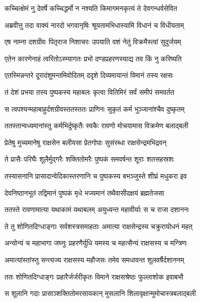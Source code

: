 \twolineshloka
{कच्चित्क्षेमं नु देवर्षे कच्चिद्धर्मो न नश्यति}
{किमागमनकृत्यं ते देवगन्धर्वसेवित} %

\twolineshloka
{अब्रवीत्तु तदा वाक्यं नारदो भगवानृषिः}
{श्रूयतामभिधास्यामि विधानं च विधीयताम्} %

\twolineshloka
{एष नाम्ना दशग्रीवः पितृराज निशाचरः}
{उपयाति वशं नेतुं विक्रमैस्त्वां सुदुर्जयम्} %

\twolineshloka
{एतेन कारणेनाहं त्वरितोऽस्म्यागतः प्रभो}
{दण्डप्रहरणस्याद्य तव किं नु करिष्यति} %

\twolineshloka
{एतस्मिन्नन्तरे दूरादंशुमन्तमिवोदितम्}
{ददृशे दिव्यमायान्तं विमानं तस्य रक्षसः} %

\twolineshloka
{तं देशं प्रभया तस्य पुष्पकस्य महाबलः}
{कृत्वा वितिमिरं सर्वं समीपं समवर्तत} %

\twolineshloka
{स त्वपश्यन्महाबाहुर्दशग्रीवस्ततस्ततः}
{प्राणिनः सुकृतं कर्म भुञ्जानांश्चैव दुष्कृतम्} %

\twolineshloka
{ततस्तान्वध्यमानांस्तु कर्मभिर्दुष्कृतैः स्वकैः}
{रावणो मोचयामास विक्रमेण बलाद्बली} %

\twolineshloka
{प्रेतेषु मुच्यमानेषु राक्षसेन बलीयसा}
{प्रेतगोपाः सुसंरब्धा राक्षसेन्द्रमभिद्रवन्} %

\twolineshloka
{ते प्रासैः परिघैः शूलैर्मुद्गरैः शक्तितोमरैः}
{पुष्पकं समवर्षन्त शूराः शतसहस्रशः} %

\twolineshloka
{तस्यासनानि प्रासादान्वेदिकास्तरणानि च}
{पुष्पकस्य बभञ्जुस्ते शीघ्रं मधुकरा इव} %

\twolineshloka
{देवनिष्ठानभूतं तद्विमानं पुष्पकं मृधे}
{भज्यमानं तथैवासीदक्षयं ब्रह्मतेजसा} %

\twolineshloka
{ततस्ते रावणामात्या यथाकामं यथाबलम्}
{अयुध्यन्त महावीर्याः स च राजा दशाननः} %

\twolineshloka
{ते तु शोणितदिग्धाङ्गाः सर्वशस्त्रसमाहताः}
{अमात्या राक्षसेन्द्रस्य चक्रुरायोधनं महत्} %

\twolineshloka
{अन्योन्यं च महाभागा जघ्नुः प्रहरणैर्युधि}
{यमस्य च महत्सैन्यं राक्षसस्य च मन्त्रिणः} %

\twolineshloka
{अमात्यांस्तांस्तु सन्त्यज्य राक्षसस्य महौजसः}
{तमेव समधावन्त शूलवर्षैर्दशाननम्} %

\twolineshloka
{ततः शोणितदिग्धाङ्गः प्रहारैर्जर्जरीकृतः}
{विमाने राक्षसश्रेष्ठः फुल्लाशोक इवाबभौ} %

\twolineshloka
{स शूलानि गदाः प्रासाञ्शक्तितोमरसायकान्}
{मुसलानि शिलावृक्षान्मुमोचास्त्रबलाद्बली} %

